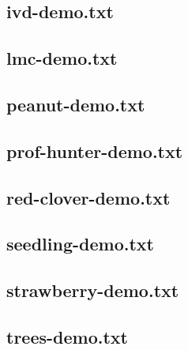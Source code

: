 \documentclass[12pt]{article}
\begin{document}
\newpage
\subsection{ivd-demo.txt}


\newpage
\subsection{lmc-demo.txt}


\newpage
\subsection{peanut-demo.txt}


\newpage
\subsection{prof-hunter-demo.txt}


\newpage
\subsection{red-clover-demo.txt}


\newpage
\subsection{seedling-demo.txt}


\newpage
\subsection{strawberry-demo.txt}


\newpage
\subsection{trees-demo.txt}

\end{document}
